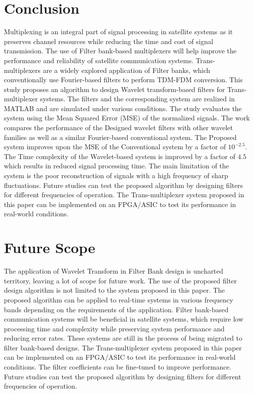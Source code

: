 \chapter{Conclusion}
Multiplexing is an integral part of signal processing in satellite systems as it preserves channel resources while reducing the time and cost of signal transmission. The use of Filter bank-based multiplexers will help improve the performance and reliability of satellite communication systems. Trans-multiplexers are a widely explored application of Filter banks, which conventionally use Fourier-based filters to perform TDM-FDM conversion. This study proposes an algorithm to design Wavelet transform-based filters for Trans-multiplexer systems. The filters and the corresponding system are realized in MATLAB and are simulated under various conditions. The study evaluates the system using the Mean Squared Error (MSE) of the normalized signals. The work compares the performance of the Designed wavelet filters with other wavelet families as well as a similar Fourier-based conventional system. The Proposed system improves upon the MSE of the Conventional system by a factor of $10^{-2.5}$. The Time complexity of the Wavelet-based system is improved by a factor of $4.5$ which results in reduced signal processing time. The main limitation of the system is the poor reconstruction of signals with a high frequency of sharp fluctuations. Future studies can test the proposed algorithm by designing filters for different frequencies of operation. The Trans-multiplexer system proposed in this paper can be implemented on an FPGA/ASIC to test its performance in real-world conditions.

\chapter{Future Scope}
The application of Wavelet Transform in Filter Bank design is uncharted territory, leaving a lot of scope for future work. The use of the proposed filter design algorithm is not limited to the system proposed in this paper. The proposed algorithm can be applied to real-time systems in various frequency bands depending on the requirements of the application. Filter bank-based communication systems will be beneficial in satellite systems, which require low processing time and complexity while preserving system performance and reducing error rates. These systems are still in the process of being migrated to filter bank-based designs. The Trans-multiplexer system proposed in this paper can be implemented on an FPGA/ASIC to test its performance in real-world conditions. The filter coefficients can be fine-tuned to improve performance. Future studies can test the proposed algorithm by designing filters for different frequencies of operation.


